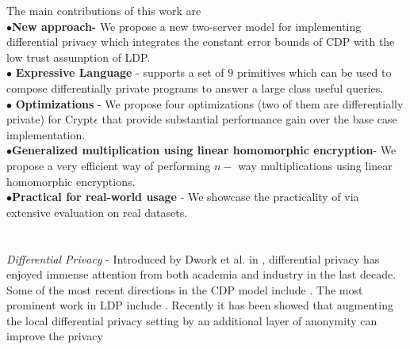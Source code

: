 The main contributions of this work are\\
$\bullet$\textbf{New approach-} We propose a new two-server model for implementing differential privacy which integrates the constant error bounds of \textsf{CDP}  with the low trust assumption of  \textsf{LDP}. \\
$\bullet$ \textbf{Expressive Language} - \system supports a set of $9$ primitives which can be used to compose differentially private programs to answer a large class useful queries. \\
$\bullet$ \textbf{Optimizations} - We propose four optimizations (two of them are differentially private) for Crypt$\epsilon$ that provide substantial performance gain over the base case implementation. \\
$\bullet $\textbf{Generalized multiplication using linear homomorphic encryption}- We propose a very efficient way of performing $n-$ way multiplications using linear homomorphic encryptions.\\
$\bullet $\textbf{Practical for real-world usage} -  We showcase the practicality of \system via extensive evaluation on real datasets.\\ \\\\\textit{Differential Privacy }- Introduced by Dwork et al. in \cite{Dork}, differential privacy has enjoyed immense attention from both academia and industry in the last decade. Some of the most recent directions in the \textsf{CDP} model include \cite{MVG,Blocki,AHP,DAWA,hist1,hist2,hist3,hist4,hist6,hist7,hist8,A1,A2,A3,A4,A5,A6,A7,A8,u1,u2,MWEM}. The most prominent work in \textsf{LDP} include \cite{LDP1, LDP2, Rappor1,HH,Rappor2,HH2,Cormode, CALM,15,itemset}.
Recently it has been showed that augmenting the local differential privacy setting by an additional layer of anonymity can improve the privacy
